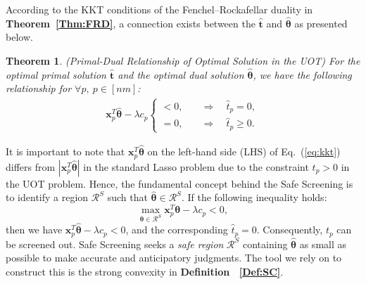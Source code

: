 \documentclass[11pt]{article}
\newtheorem{thm}{Theorem}
\renewcommand{\vec}[1]{\bm{#1}}
\begin{document}
According to the KKT conditions of the Fenchel--Rockafellar duality in {\bf Theorem~\ref{Thm:FRD}}, a connection exists between the $\hat{\vec{t}}$ and $\hat{\vec{\theta}}$ as presented below.
%
\begin{thm} (Primal-Dual Relationship of Optimal Solution in the UOT) For the optimal primal solution $\hat{\vec{t}}$ and the optimal dual solution $\hat{\vec{\theta}}$, we have the following relationship for $\forall p, ~p \in [nm]$:
\label{Thm:KKT}
\begin{equation}
\label{eq:kkt}
\begin{split}
\vec{x}_p^T\hat{\vec{\theta}} -\lambda c_p \left\{
\begin{aligned}
< 0, \quad& \Longrightarrow \quad\hat{t}_p = 0,\\
= 0, \quad& \Longrightarrow \quad\hat{t}_p \geq 0.
\end{aligned}
\right.
\end{split}
\end{equation}
\end{thm}

It is important to note that $\vec{x}_p^T\hat{\vec{\theta}}$ on the left-hand side (LHS) of Eq.~(\ref{eq:kkt}) differs from $|\vec{x}_p^T\hat{\vec{\theta}}|$ in the standard Lasso problem due to the constraint $t_p > 0$ in the UOT problem. Hence, the fundamental concept behind the Safe Screening is to identify a region $\mathcal{R}^{S}$ such that $\hat{\vec{\theta}} \in \mathcal{R}^S$. If the following inequality holds:
\begin{equation}
\label{eq:kktineq}
\max_{\vec{\theta} \in \mathcal{R}^S} \vec{x}_p^T\vec{\theta} -\lambda c_p < 0,
\end{equation}
then we have $\vec{x}_p^T\hat{\vec{\theta}} -\lambda c_p < 0$, and the corresponding $\hat{{t}}_p = 0$. Consequently, $t_p$ can be screened out. Safe Screening seeks a {\it safe region} $\mathcal{R}^{S}$ containing $\hat{\vec{\theta}}$ as small as possible to make accurate and anticipatory judgments. The tool we rely on to construct this is the strong convexity in {\bf Definition~ \ref{Def:SC}}. 
\end{document}
